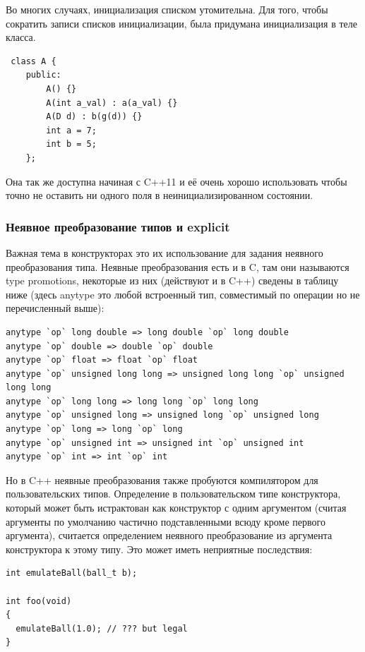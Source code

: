 \documentclass[a4paper,12pt,oneside]{article}
\begin{document}
Во многих случаях, инициализация списком утомительна. Для того, чтобы сократить записи списков инициализации, была придумана инициализация в теле класса.

\begin{lstlisting}
 class A {
    public:
        A() {}
        A(int a_val) : a(a_val) {}
        A(D d) : b(g(d)) {}
        int a = 7;
        int b = 5;  
    };
\end{lstlisting}

Она так же доступна начиная с C++11 и её очень хорошо использовать чтобы точно не оставить ни одного поля в неинициализированном состоянии.

\subsubsection{Неявное преобразование типов и explicit}\label{Explicit}

Важная тема в конструкторах это их использование для задания неявного преобразования типа. Неявные преобразования есть и в C, там они называются type promotions, некоторые из них (действуют и в C++) сведены в таблицу ниже (здесь anytype это любой встроенный тип, совместимый по операции но не перечисленный выше):

\begin{lstlisting}
anytype `op` long double => long double `op` long double
anytype `op` double => double `op` double
anytype `op` float => float `op` float
anytype `op` unsigned long long => unsigned long long `op` unsigned long long
anytype `op` long long => long long `op` long long
anytype `op` unsigned long => unsigned long `op` unsigned long
anytype `op` long => long `op` long
anytype `op` unsigned int => unsigned int `op` unsigned int
anytype `op` int => int `op` int
\end{lstlisting}

Но в C++ неявные преобразования также пробуются компилятором для пользовательских типов. Определение в пользовательском типе конструктора, который может быть истрактован как конструктор с одним аргументом (считая аргументы по умолчанию частично подставленными всюду кроме первого аргумента), считается определением неявного преобразование из аргумента конструктора к этому типу. Это может иметь неприятные последствия:

\begin{lstlisting}
int emulateBall(ball_t b);

int foo(void)
{
  emulateBall(1.0); // ??? but legal
}
\end{lstlisting}
\end{document}
